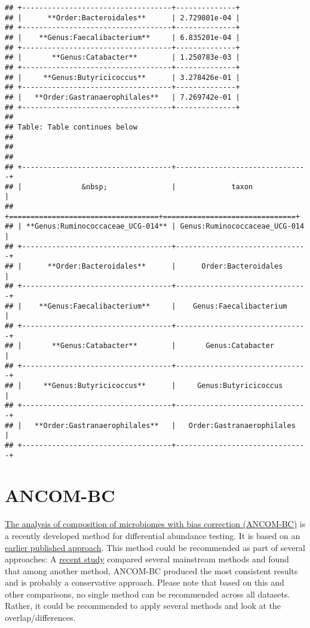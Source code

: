 \documentclass[
  oneside]{book}
\begin{document}
\begin{verbatim}
## +-----------------------------------+--------------+
## |      **Order:Bacteroidales**      | 2.729801e-04 |
## +-----------------------------------+--------------+
## |    **Genus:Faecalibacterium**     | 6.835201e-04 |
## +-----------------------------------+--------------+
## |       **Genus:Catabacter**        | 1.250783e-03 |
## +-----------------------------------+--------------+
## |     **Genus:Butyricicoccus**      | 3.278426e-01 |
## +-----------------------------------+--------------+
## |   **Order:Gastranaerophilales**   | 7.269742e-01 |
## +-----------------------------------+--------------+
## 
## Table: Table continues below
## 
##  
## 
## +-----------------------------------+-------------------------------+
## |              &nbsp;               |             taxon             |
## +===================================+===============================+
## | **Genus:Ruminococcaceae_UCG-014** | Genus:Ruminococcaceae_UCG-014 |
## +-----------------------------------+-------------------------------+
## |      **Order:Bacteroidales**      |      Order:Bacteroidales      |
## +-----------------------------------+-------------------------------+
## |    **Genus:Faecalibacterium**     |    Genus:Faecalibacterium     |
## +-----------------------------------+-------------------------------+
## |       **Genus:Catabacter**        |       Genus:Catabacter        |
## +-----------------------------------+-------------------------------+
## |     **Genus:Butyricicoccus**      |     Genus:Butyricicoccus      |
## +-----------------------------------+-------------------------------+
## |   **Order:Gastranaerophilales**   |   Order:Gastranaerophilales   |
## +-----------------------------------+-------------------------------+
\end{verbatim}

\hypertarget{ancom-bc}{%
\section{ANCOM-BC}\label{ancom-bc}}

\href{https://www.nature.com/articles/s41467-020-17041-7}{The analysis of composition of microbiomes with bias correction (ANCOM-BC)}
is a recently developed method for differential abundance testing. It is based on an
\href{https://www.ncbi.nlm.nih.gov/pmc/articles/PMC4450248/}{earlier published approach}.
This method could be recommended as part of several approaches:
A \href{https://www.biorxiv.org/content/10.1101/2021.05.10.443486v1.full}{recent study}
compared several mainstream methods and found that among another method, ANCOM-BC produced
the most consistent results and is probably a conservative approach. Please note that
based on this and other comparisons, no single method can be recommended across all datasets.
Rather, it could be recommended to apply several methods and look at the overlap/differences.
\end{document}
